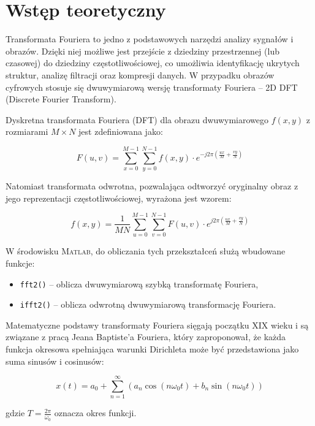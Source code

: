 \section{Wstęp teoretyczny}

Transformata Fouriera to jedno z podstawowych narzędzi analizy sygnałów i obrazów. Dzięki niej możliwe jest przejście z dziedziny przestrzennej (lub czasowej) do dziedziny częstotliwościowej, co umożliwia identyfikację ukrytych struktur, analizę filtracji oraz kompresji danych. W przypadku obrazów cyfrowych stosuje się dwuwymiarową wersję transformaty Fouriera – 2D DFT (Discrete Fourier Transform).

Dyskretna transformata Fouriera (DFT) dla obrazu dwuwymiarowego $f(x, y)$ z rozmiarami $M \times N$ jest zdefiniowana jako:

\begin{equation}
	F(u, v) = \sum_{x=0}^{M-1} \sum_{y=0}^{N-1} f(x, y) \cdot e^{-j2\pi \left( \frac{ux}{M} + \frac{vy}{N} \right)}
\end{equation}

Natomiast transformata odwrotna, pozwalająca odtworzyć oryginalny obraz z jego reprezentacji częstotliwościowej, wyrażona jest wzorem:

\begin{equation}
	f(x, y) = \frac{1}{MN} \sum_{u=0}^{M-1} \sum_{v=0}^{N-1} F(u, v) \cdot e^{j2\pi \left( \frac{ux}{M} + \frac{vy}{N} \right)}
\end{equation}

W środowisku \textsc{Matlab}, do obliczania tych przekształceń służą wbudowane funkcje:
\begin{itemize}
	\item \texttt{fft2()} – oblicza dwuwymiarową szybką transformatę Fouriera,
	\item \texttt{ifft2()} – oblicza odwrotną dwuwymiarową transformację Fouriera.
\end{itemize}

Matematyczne podstawy transformaty Fouriera sięgają początku XIX wieku i są związane z pracą Jeana Baptiste'a Fouriera, który zaproponował, że każda funkcja okresowa spełniająca warunki Dirichleta może być przedstawiona jako suma sinusów i cosinusów:

\begin{equation}
	x(t) = a_0 + \sum_{n=1}^{\infty} \left( a_n \cos(n\omega_0 t) + b_n \sin(n\omega_0 t) \right)
\end{equation}

gdzie $T = \frac{2\pi}{\omega_0}$ oznacza okres funkcji.

